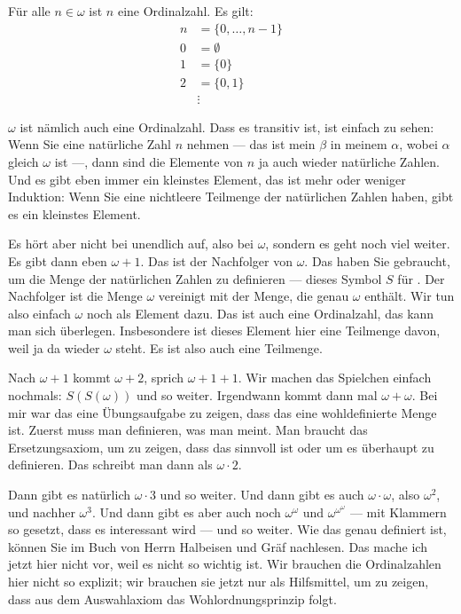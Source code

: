 \begin{math-stroke}
\begin{remark}
Für alle $n \in \omega$ ist $n$ eine Ordinalzahl. Es gilt:
\begin{align*}
n &= \{0, \dots, n-1\} \\
0 &= \emptyset \\
1 &= \{0\} \\
2 &= \{0, 1\} \\
&\vdots
\end{align*}
\end{remark}
\end{math-stroke}

\begin{spoken-clean}[00:33:09 - 00:34:45]
$\omega$ ist nämlich auch eine Ordinalzahl. Dass es transitiv ist, ist einfach zu sehen: Wenn Sie eine natürliche Zahl $n$ nehmen --- das ist mein $\beta$ in meinem $\alpha$, wobei $\alpha$ gleich $\omega$ ist ---, dann sind die Elemente von $n$ ja auch wieder natürliche Zahlen. Und es gibt eben immer ein kleinstes Element, das ist mehr oder weniger Induktion: Wenn Sie eine nichtleere Teilmenge der natürlichen Zahlen haben, gibt es ein kleinstes Element.

Es hört aber nicht bei unendlich auf, also bei $\omega$, sondern es geht noch viel weiter. Es gibt dann eben $\omega + 1$. Das ist der Nachfolger von $\omega$. Das haben Sie gebraucht, um die Menge der natürlichen Zahlen zu definieren --- dieses Symbol $S$ für . Der Nachfolger ist die Menge $\omega$ vereinigt mit der Menge, die genau $\omega$ enthält. Wir tun also einfach $\omega$ noch als Element dazu. Das ist auch eine Ordinalzahl, das kann man sich überlegen. Insbesondere ist dieses Element hier eine Teilmenge davon, weil ja da wieder $\omega$ steht. Es ist also auch eine Teilmenge.
\end{spoken-clean}

\begin{spoken-clean}[00:34:45 - 00:36:15]
Nach $\omega + 1$ kommt $\omega + 2$, sprich $\omega + 1 + 1$. Wir machen das Spielchen einfach nochmals: $S(S(\omega))$ und so weiter. Irgendwann kommt dann mal $\omega + \omega$. Bei mir war das eine Übungsaufgabe zu zeigen, dass das eine wohldefinierte Menge ist. Zuerst muss man definieren, was man meint. Man braucht das Ersetzungsaxiom, um zu zeigen, dass das sinnvoll ist oder um es überhaupt zu definieren. Das schreibt man dann als $\omega \cdot 2$.

Dann gibt es natürlich $\omega \cdot 3$ und so weiter. Und dann gibt es auch $\omega \cdot \omega$, also $\omega^2$, und nachher $\omega^3$. Und dann gibt es aber auch noch $\omega^\omega$ und $\omega^{\omega^\omega}$ --- mit Klammern so gesetzt, dass es interessant wird --- und so weiter. Wie das genau definiert ist, können Sie im Buch von Herrn Halbeisen und Gräf nachlesen. Das mache ich jetzt hier nicht vor, weil es nicht so wichtig ist. Wir brauchen die Ordinalzahlen hier nicht so explizit; wir brauchen sie jetzt nur als Hilfsmittel, um zu zeigen, dass aus dem Auswahlaxiom das Wohlordnungsprinzip folgt.
\end{spoken-clean}


